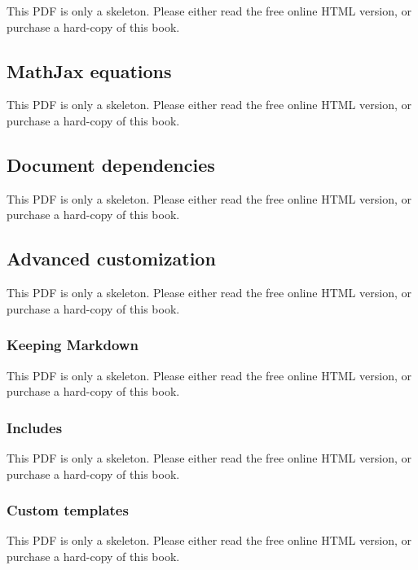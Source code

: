 \documentclass[
  11pt,
]{krantz}
\theoremstyle{definition}
\theoremstyle{definition}
\theoremstyle{definition}
\theoremstyle{definition}
\theoremstyle{remark}
\begin{document}
This PDF is only a skeleton. Please either read the free online HTML version, or purchase a hard-copy of this book.

\subsection{MathJax equations}\label{mathjax-equations}

This PDF is only a skeleton. Please either read the free online HTML version, or purchase a hard-copy of this book.

\subsection{Document dependencies}\label{document-dependencies}

This PDF is only a skeleton. Please either read the free online HTML version, or purchase a hard-copy of this book.

\subsection{Advanced customization}\label{advanced-customization}

This PDF is only a skeleton. Please either read the free online HTML version, or purchase a hard-copy of this book.

\subsubsection{Keeping Markdown}\label{keeping-markdown}

This PDF is only a skeleton. Please either read the free online HTML version, or purchase a hard-copy of this book.

\subsubsection{Includes}\label{includes}

This PDF is only a skeleton. Please either read the free online HTML version, or purchase a hard-copy of this book.

\subsubsection{Custom templates}\label{custom-templates}

This PDF is only a skeleton. Please either read the free online HTML version, or purchase a hard-copy of this book.
\end{document}
